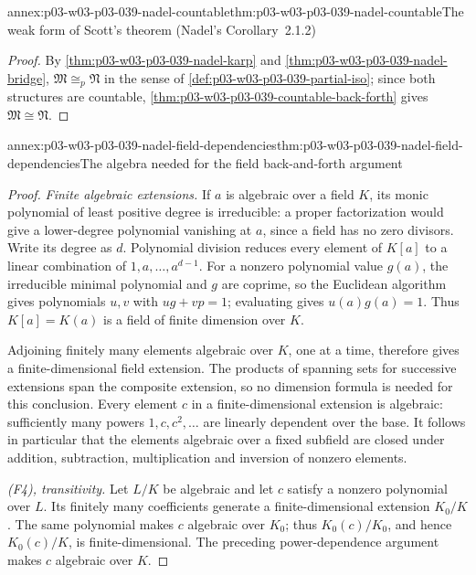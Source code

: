 \begin{annexitem}{annex:p03-w03-p03-039-nadel-countable}{thm:p03-w03-p03-039-nadel-countable}{The weak form of Scott's theorem (Nadel's Corollary~2.1.2)}
\begin{proof}
By \cref{thm:p03-w03-p03-039-nadel-karp} and
\cref{thm:p03-w03-p03-039-nadel-bridge}, \(\mathfrak M\cong_p\mathfrak N\) in
the sense of \cref{def:p03-w03-p03-039-partial-iso}; since both structures
are countable, \cref{thm:p03-w03-p03-039-countable-back-forth} gives
\(\mathfrak M\cong\mathfrak N\).
\end{proof}
\end{annexitem}

\begin{annexitem}{annex:p03-w03-p03-039-nadel-field-dependencies}{thm:p03-w03-p03-039-nadel-field-dependencies}{The algebra needed for the field back-and-forth argument}
\begin{proof}
\emph{Finite algebraic extensions.} If \(a\) is algebraic over a field
\(K\), its monic polynomial of least positive degree is irreducible:
a proper factorization would give a lower-degree polynomial vanishing
at \(a\), since a field has no zero divisors. Write its degree as
\(d\). Polynomial division reduces every element of \(K[a]\) to a
linear combination of \(1,a,\ldots,a^{d-1}\). For a nonzero polynomial
value \(g(a)\), the irreducible minimal polynomial and \(g\) are
coprime, so the Euclidean algorithm gives polynomials \(u,v\) with
\(ug+v p=1\); evaluating gives \(u(a)g(a)=1\). Thus \(K[a]=K(a)\)
is a field of finite dimension over \(K\).

Adjoining finitely many elements algebraic over \(K\), one at a time,
therefore gives a finite-dimensional field extension. The products of
spanning sets for successive extensions span the composite extension,
so no dimension formula is needed for this conclusion. Every element
\(c\) in a finite-dimensional extension is algebraic: sufficiently
many powers \(1,c,c^2,\ldots\) are linearly dependent over the base.
It follows in particular that the elements algebraic over a fixed
subfield are closed under addition, subtraction, multiplication and
inversion of nonzero elements.

\emph{(F4), transitivity.} Let \(L/K\) be algebraic and let \(c\)
satisfy a nonzero polynomial over \(L\). Its finitely many coefficients
generate a finite-dimensional extension \(K_0/K\). The same polynomial
makes \(c\) algebraic over \(K_0\); thus \(K_0(c)/K_0\), and hence
\(K_0(c)/K\), is finite-dimensional. The preceding power-dependence
argument makes \(c\) algebraic over \(K\).


\end{proof}
\end{annexitem}
